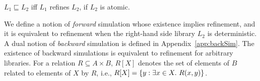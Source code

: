 \begin{theorem}
  $L_1 \sqsubseteq L_2$ if{f} $L_1$ refines $L_2$,
  if $L_2$ is atomic.

\end{theorem}

We define a notion of \emph{forward} simulation whose existence implies refinement, and it is equivalent to refinement when the right-hand side library $L_2$ is deterministic. A dual notion of \emph{backward} simulation is defined in Appendix~\ref{app:backSim}. The existence of backward simulations is equivalent to refinement for arbitrary libraries.
For a relation $R\subseteq A\times B$, $R[X]$ denotes the set of elements of $B$ related to elements of $X$ by $R$, i.e., $R[X]=\set{y:\exists x\in X.\ R(x,y)}$.


